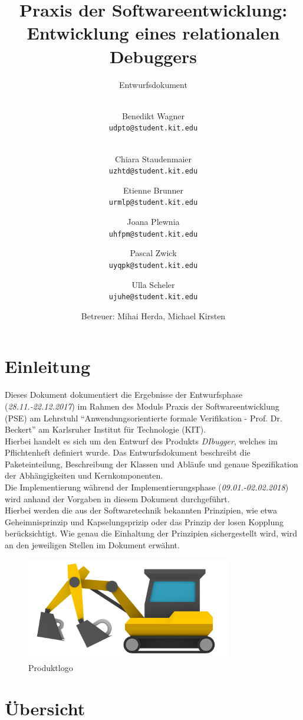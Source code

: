 \documentclass[parskip=full]{scrartcl}
\title{
	\vspace{2cm}
	\myfont 
	Praxis der Softwareentwicklung:\\ 
	Entwicklung eines relationalen Debuggers\\
}
\subtitle{
	\vspace{1cm}
	\myfont
	Entwurfsdokument
}
\author{
	\vspace{1cm} \\
	Benedikt Wagner\\
	\texttt{udpto@student.kit.edu}
	\and \vspace{1cm} \\ Chiara Staudenmaier\\
	\texttt{uzhtd@student.kit.edu}
	\and Etienne Brunner\\
	\texttt{urmlp@student.kit.edu}
	\and Joana Plewnia\\
	\texttt{uhfpm@student.kit.edu} 
	\and Pascal Zwick\\
	\texttt{uyqpk@student.kit.edu}
	\and Ulla Scheler\\
	\texttt{ujuhe@student.kit.edu}
	\vspace{1cm}
	\and Betreuer: Mihai Herda, Michael Kirsten
	\vspace{4cm}
}
\begin{document}
\clearpage
\maketitle
{}
\newpage

\tableofcontents
\newpage
{}
\section{Einleitung}
Dieses Dokument dokumentiert die Ergebnisse der Entwurfsphase (\textit{28.11.-22.12.2017}) im Rahmen
des Moduls Praxis der Softwareentwicklung (PSE) am Lehrstuhl \enquote{Anwendungsorientierte formale Verifikation - Prof. Dr. Beckert} am Karlsruher Institut für Technologie (KIT).\\
Hierbei handelt es sich um den Entwurf des Produkts \textit{DIbugger}, welches im Pflichtenheft definiert wurde. 
Das Entwurfsdokument beschreibt die Paketeinteilung, Beschreibung der Klassen und Abläufe und genaue Spezifikation der Abhängigkeiten und Kernkomponenten. 
\\Die Implementierung während der Implementierungsphase (\textit{09.01.-02.02.2018}) wird anhand der Vorgaben in diesem Dokument durchgeführt. \\
Hierbei werden die aus der Softwaretechnik bekannten Prinzipien, wie etwa Geheimnisprinzip und Kapselungsprizip oder das Prinzip der losen Kopplung berücksichtigt. Wie genau die Einhaltung der Prinzipien sichergestellt wird, wird an den jeweiligen Stellen im Dokument erwähnt. 
\vspace{1cm}
\begin{figure}[!h]
\centering
\includegraphics[width=0.8\textwidth]{../Plichtenheft/logo_nongi.png}
\caption{Produktlogo}
\end{figure}

\newpage
\section{Übersicht}
\end{document}
